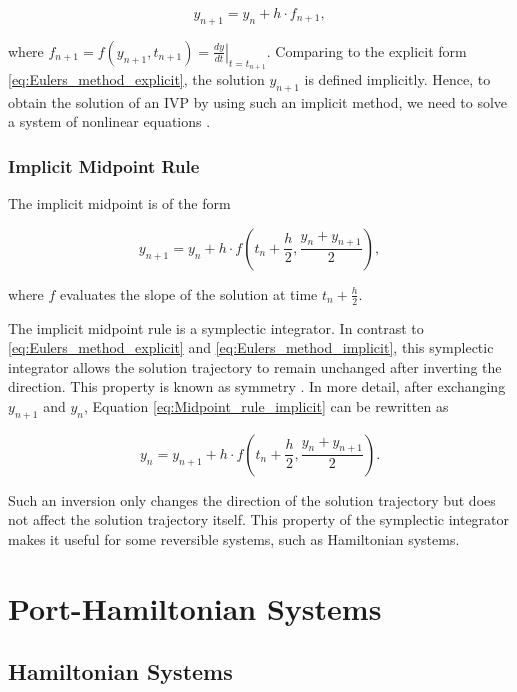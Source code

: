 \documentclass[
	parskip, 			   %
	twoside, 			   %
	DIV=14, 			   %
	BCOR=15.0mm, 		   %
	headsepline, 		   %
	open=right, 		   %
	captions=tableheading, %
	bibliography=totoc,    %
	numbers=noenddot       %
]{scrreprt}
\begin{document}
\begin{equation}
    \label{eq:Eulers_method_implicit}
    y_{n+1} = y_{n} + h \cdot f_{n+1},
\end{equation}

where $f_{n+1} = f(y_{n+1}, t_{n+1}) = \left. \frac{dy}{dt} \right|_{t=t_{n+1}}$. Comparing to the explicit form \ref{eq:Eulers_method_explicit}, the solution $y_{n+1}$ is defined implicitly. Hence, to obtain the solution of an IVP by using such an implicit method, we need to solve a system of nonlinear equations \cite{hairer2006geometric}.

\subsection{Implicit Midpoint Rule}
The implicit midpoint is of the form

\begin{equation}
    \label{eq:Midpoint_rule_implicit}
    y_{n+1} = y_{n} + h \cdot f(t_{n}+\frac{h}{2} ,\frac{y_{n} + y_{n+1}}{2}),
\end{equation}

where $f$ evaluates the slope of the solution at time $t_{n}+\frac{h}{2}$.

The implicit midpoint rule is a symplectic integrator. In contrast to \ref{eq:Eulers_method_explicit} and \ref{eq:Eulers_method_implicit}, this symplectic integrator allows the solution trajectory to remain unchanged after inverting the direction. This property is known as symmetry \cite{hairer2006geometric}. In more detail, after exchanging $y_{n+1}$ and $y_{n}$, Equation \ref{eq:Midpoint_rule_implicit} can be rewritten as

\begin{equation}
    \label{eq:Midpoint_rule_implicit_inverted}
    y_{n} = y_{n+1} + h \cdot f(t_{n}+\frac{h}{2} ,\frac{y_{n} + y_{n+1}}{2}).
\end{equation}

Such an inversion only changes the direction of the solution trajectory but does not affect the solution trajectory itself. This property of the symplectic integrator makes it useful for some reversible systems, such as Hamiltonian systems.

\clearpage
\chapter{Port-Hamiltonian Systems}
\label{ch:chapter3}

\section{Hamiltonian Systems}
\end{document}
